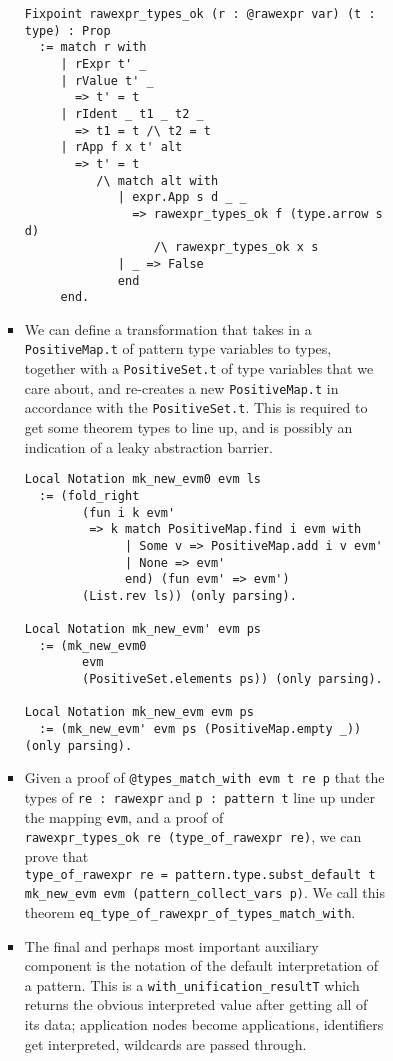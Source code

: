 \documentclass[
]{article}
\begin{document}
\begin{itemize}
\begin{itemize}
\begin{itemize}
\begin{itemize}
\begin{itemize}
\begin{itemize}
\begin{verbatim}
Fixpoint rawexpr_types_ok (r : @rawexpr var) (t : type) : Prop
  := match r with
     | rExpr t' _
     | rValue t' _
       => t' = t
     | rIdent _ t1 _ t2 _
       => t1 = t /\ t2 = t
     | rApp f x t' alt
       => t' = t
          /\ match alt with
             | expr.App s d _ _
               => rawexpr_types_ok f (type.arrow s d)
                  /\ rawexpr_types_ok x s
             | _ => False
             end
     end.
\end{verbatim}
          \item
            We can define a transformation that takes in a
            \texttt{PositiveMap.t} of pattern type variables to types,
            together with a \texttt{PositiveSet.t} of type variables
            that we care about, and re-creates a new
            \texttt{PositiveMap.t} in accordance with the
            \texttt{PositiveSet.t}. This is required to get some theorem
            types to line up, and is possibly an indication of a leaky
            abstraction barrier.

\begin{verbatim}
Local Notation mk_new_evm0 evm ls
  := (fold_right
        (fun i k evm'
         => k match PositiveMap.find i evm with
              | Some v => PositiveMap.add i v evm'
              | None => evm'
              end) (fun evm' => evm')
        (List.rev ls)) (only parsing).

Local Notation mk_new_evm' evm ps
  := (mk_new_evm0
        evm
        (PositiveSet.elements ps)) (only parsing).

Local Notation mk_new_evm evm ps
  := (mk_new_evm' evm ps (PositiveMap.empty _)) (only parsing).
\end{verbatim}
          \item
            Given a proof of \texttt{@types\_match\_with\ evm\ t\ re\ p}
            that the types of \texttt{re\ :\ rawexpr} and
            \texttt{p\ :\ pattern\ t} line up under the mapping
            \texttt{evm}, and a proof of
            \texttt{rawexpr\_types\_ok\ re\ (type\_of\_rawexpr\ re)}, we
            can prove that
            \texttt{type\_of\_rawexpr\ re\ =\ pattern.type.subst\_default\ t\ mk\_new\_evm\ evm\ (pattern\_collect\_vars\ p)}.
            We call this theorem
            \texttt{eq\_type\_of\_rawexpr\_of\_types\_match\_with\textquotesingle{}}.
          \item
            The final and perhaps most important auxiliary component is
            the notation of the default interpretation of a pattern.
            This is a
            \texttt{with\_unification\_resultT\textquotesingle{}} which
            returns the obvious interpreted value after getting all of
            its data; application nodes become applications, identifiers
            get interpreted, wildcards are passed through.


\end{itemize}
\end{itemize}
\end{itemize}
\end{itemize}
\end{itemize}
\end{itemize}
\end{document}
